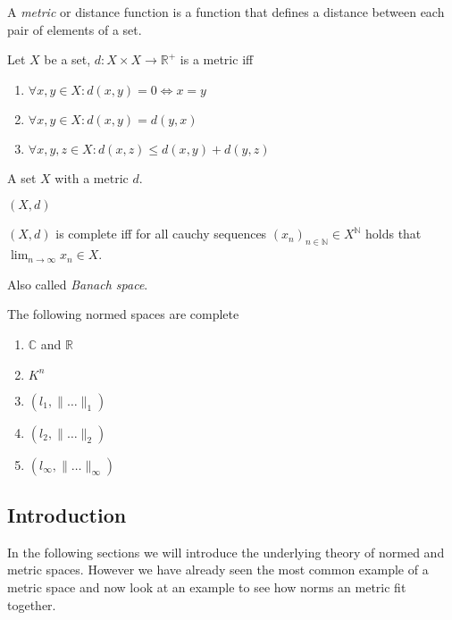 A \emph{metric} or distance function is a function that defines a distance between each pair of elements of a set.

\begin{definition}[Metric]
   Let \(X\) be a set, \(d: X \times X \to \mathbb{R}^+\) is a metric iff
   \begin{enumerate}[label=\roman*, align=Center]
      \item \(\forall x, y \in X: d(x, y) = 0 \iff x = y\)
      \item \(\forall x, y \in X: d(x, y) = d(y, x)\)
      \item \(\forall x, y, z \in X: d(x, z) \leq d(x, y) + d(y, z)\)
   \end{enumerate}
\end{definition}

\begin{definition}
   A set \(X\) with a metric \(d\).
\end{definition}
\begin{remark}[Notation]
   \((X, d)\)
\end{remark}

\begin{definition}
   \((X, d)\) is complete iff for all cauchy sequences \((x_n)_{n \in \mathbb{N}} \in X^\mathbb{N}\) holds that \(\lim_{n \to \infty} x_n \in X\).
\end{definition}
\begin{remark}
   Also called \emph{Banach space}.
\end{remark}

\begin{theorem}
   The following normed spaces are complete
   \begin{enumerate}[label=\roman*, align=Center]
      \item \(\mathbb{C}\) and \(\mathbb{R}\)
      \item \(K^n\)
      \item \((l_1, \|\ldots\|_1)\)
      \item \((l_2, \|\ldots\|_2)\)
      \item \((l_\infty, \|\ldots\|_\infty)\)
   \end{enumerate}
\end{theorem}

\subsection{Introduction}
In the following sections we will introduce the underlying theory of normed and metric spaces.
However we have already seen the most common example of a metric space and now look at an example to see how norms an metric fit together.

